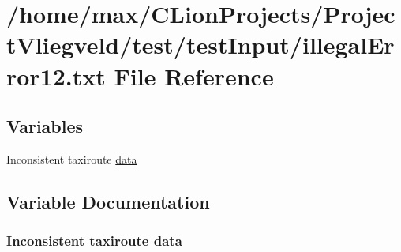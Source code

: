 \hypertarget{illegalError12_8txt}{}\section{/home/max/\+C\+Lion\+Projects/\+Project\+Vliegveld/test/test\+Input/illegal\+Error12.txt File Reference}
\label{illegalError12_8txt}
\subsection*{Variables}
\begin{DoxyCompactItemize}
\item 
Inconsistent taxiroute \hyperlink{illegalError12_8txt_a2db91b8ae553a8888179c8dd6e74453f}{data}
\end{DoxyCompactItemize}


\subsection{Variable Documentation}
\subsubsection[{\texorpdfstring{data}{data}}]{\setlength{\rightskip}{0pt plus 5cm}Inconsistent taxiroute data}\hypertarget{illegalError12_8txt_a2db91b8ae553a8888179c8dd6e74453f}{}\label{illegalError12_8txt_a2db91b8ae553a8888179c8dd6e74453f}
